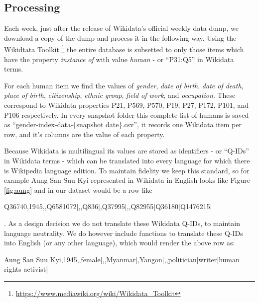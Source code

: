 \documentclass[letterpaper]{article}
\begin{document}
\subsection{Processing}
Each week, just after the release of Wikidata's official weekly data dump, we download a copy of the dump and process it in the following way. Using the Wikidtata Toolkit \footnote{\url{https://www.mediawiki.org/wiki/Wikidata_Toolkit}} the entire database is subsetted to only those items which have the property \textit{instance of} with value \textit{human} - or ``P31:Q5'' in Wikidata terms.

For each human item we find the values of \textit{gender}, \textit{date of birth}, \textit{date of death}, \textit{place of birth}, \textit{citizenship}, \textit{ethnic group}, \textit{field of work}, and \textit{occupation}. These correspond to Wikidata properties P21, P569, P570, P19, P27, P172, P101, and P106 respectively.  In every snapshot folder this complete list of humans is saved as ``gender-index-data-\{snapshot date\}.csv'', it records one Wikidata item per row, and it's columns are the value of each property. 

Because Wikidata is multilingual its values are stored as identifiers - or ``Q-IDs'' in Wikidata terms - which can be translated into every language for which there is Wikipedia language edition. To maintain fidelity we keep this standard, so for example Aung San Suu Kyi represented in Wikidata in English looks like Figure \ref{fig:aung} and in our dataset would be a row like \begin{small} Q36740,1945,,Q6581072|,,Q836|,Q37995|,,Q82955|Q36180|Q1476215|
\end{small}. As a design decision we do not translate these Wikidata Q-IDs, to maintain language neutrality. We do however include functions to translate these Q-IDs into English (or any other language), which would render the above row as: \\
\begin{small} Aung San Suu Kyi,1945,,female|,,Myanmar|,Yangon|,,politician|writer|human rights activist|
\end{small}
\end{document}
